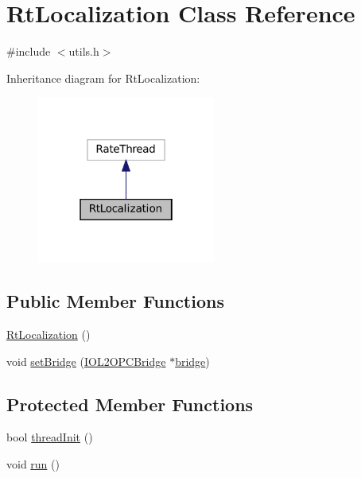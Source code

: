 \hypertarget{classRtLocalization}{}\section{Rt\+Localization Class Reference}
\label{classRtLocalization}


{\ttfamily \#include $<$utils.\+h$>$}



Inheritance diagram for Rt\+Localization\+:
\nopagebreak
\begin{figure}[H]
\begin{center}
\leavevmode
\includegraphics[width=166pt]{classRtLocalization__inherit__graph}
\end{center}
\end{figure}
\subsection*{Public Member Functions}
\begin{DoxyCompactItemize}
\item 
\hyperlink{classRtLocalization_a456a194b15ebbbf28cfae53ab09641ce}{Rt\+Localization} ()
\item 
void \hyperlink{classRtLocalization_afe8b9fba68823957649f4aa4b776eb5f}{set\+Bridge} (\hyperlink{group__iol2opc_classIOL2OPCBridge}{I\+O\+L2\+O\+P\+C\+Bridge} $\ast$\hyperlink{classRtLocalization_a88a0e00cd0879d6faf5c28ccf7851fde}{bridge})
\end{DoxyCompactItemize}
\subsection*{Protected Member Functions}
\begin{DoxyCompactItemize}
\item 
bool \hyperlink{classRtLocalization_ac5d4d7d1e1d54feb6f51c1fc67ada6c9}{thread\+Init} ()
\item 
void \hyperlink{classRtLocalization_a8d029eee764d5e37891a1bd56ae8dc9f}{run} ()
\end{DoxyCompactItemize}
